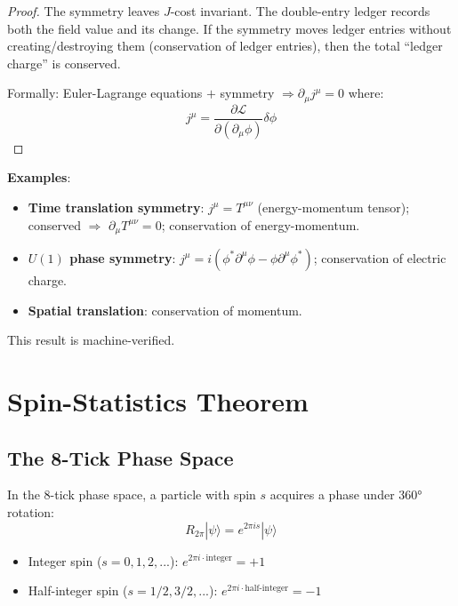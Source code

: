 \documentclass[12pt,a4paper]{article}
\theoremstyle{definition}
\theoremstyle{remark}
\begin{document}
\begin{proof}
The symmetry leaves $J$-cost invariant. The double-entry 
ledger records both the field value and its change. If the symmetry moves ledger 
entries without creating/destroying them (conservation of ledger entries), then 
the total ``ledger charge'' is conserved.

Formally: Euler-Lagrange equations $+ $ symmetry $\Rightarrow \partial_\mu j^\mu = 0$ 
where:
\begin{equation}
j^\mu = \frac{\partial \mathcal{L}}{\partial(\partial_\mu \phi)} \delta\phi
\end{equation}
\end{proof}

\textbf{Examples}:
\begin{itemize}
\item \textbf{Time translation symmetry}: $j^\mu = T^{\mu\nu}$ (energy-momentum tensor); conserved $\Rightarrow$ $\partial_\mu T^{\mu\nu} = 0$; conservation of energy-momentum.
\item \textbf{$U(1)$ phase symmetry}: $j^\mu = i(\phi^* \partial^\mu \phi - \phi \partial^\mu \phi^*)$; conservation of electric charge.
\item \textbf{Spatial translation}: conservation of momentum.
\end{itemize}

This result is machine-verified.

\section{Spin-Statistics Theorem}

\subsection{The 8-Tick Phase Space}

In the 8-tick phase space, a particle with spin $s$ acquires a phase under $360°$ rotation:
\begin{equation}
R_{2\pi}|\psi\rangle = e^{2\pi i s}|\psi\rangle
\end{equation}

\begin{itemize}
\item Integer spin ($s = 0, 1, 2, ...$): $e^{2\pi i \cdot \text{integer}} = +1$
\item Half-integer spin ($s = 1/2, 3/2, ...$): $e^{2\pi i \cdot \text{half-integer}} = -1$
\end{itemize}
\end{document}
